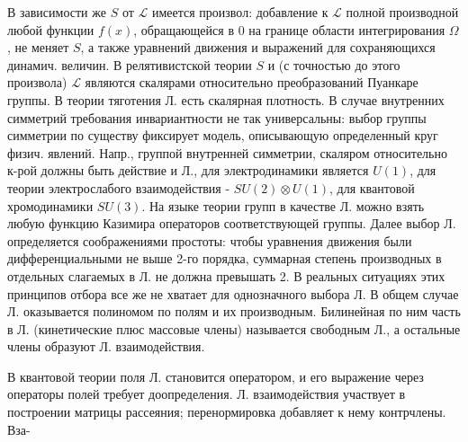 \documentclass[10pt]{article}
\begin{document}
В зависимости же $S$ от $\mathscr{L}$ имеется произвол: добавление к $\mathscr{L}$ полной производной любой функции $f(x)$, обращающейся в 0 на границе области интегрирования $\Omega$, не меняет $S$, а также уравнений движения и выражений для сохраняющихся динамич. величин. В релятивистской теории $S$ и (с точностью до этого произвола) $\mathscr{L}$ являются скалярами относительно преобразований Пуанкаре группы. В теории тяготения Л. есть скалярная плотность. В случае внутренних симметрий требования инвариантности не так универсальны: выбор группы симметрии по существу фиксирует модель, описывающую определенный круг физич. явлений. Напр., группой внутренней симметрии, скаляром относительно к-рой должны быть действие и Л., для электродинамики является $U(1)$, для теории электрослабого взаимодействия - $S U(2) \otimes U(1)$, для квантовой хромодинамики $S U(3)$. На языке теории групп в качестве Л. можно взять любую функцию Казимира операторов соответствующей группы. Далее выбор Л. определяется соображениями простоты: чтобы уравнения движения были дифференциальными не выше 2-го порядка, суммарная степень производных в отдельных слагаемых в Л. не должна превышать 2. В реальных ситуациях этих принципов отбора все же не хватает для однозначного выбора Л. В общем случае Л. оказывается полиномом по полям и их производным. Билинейная по ним часть в Л. (кинетические плюс массовые члены) называется свободным Л., а остальные члены образуют Л. взаимодействия.



В квантовой теории поля Л. становится оператором, и его выражение через операторы полей требует доопределения. Л. взаимодействия участвует в построении матрицы рассеяния; перенормировка добавляет к нему контрчлены. Вза-
\end{document}
